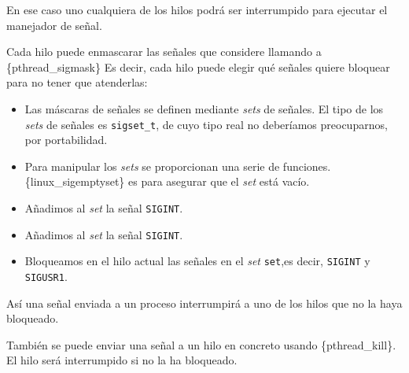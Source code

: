 En ese caso uno cualquiera de los hilos podrá ser interrumpido para
ejecutar el manejador de señal.

Cada hilo puede enmascarar las señales que considere llamando a
\{pthread\_sigmask\} Es decir, cada hilo puede elegir qué señales quiere
bloquear para no tener que atenderlas:

\begin{Shaded}
\begin{Highlighting}[]
\OperatorTok{;}               

\OperatorTok{(\&}\OperatorTok{);}          
\OperatorTok{(\&}\OperatorTok{,}\OperatorTok{);}    
\OperatorTok{(\&}\OperatorTok{,}\OperatorTok{);}   

\OperatorTok{(}\OperatorTok{,} \OperatorTok{\&}\OperatorTok{,}\OperatorTok{);} 
\end{Highlighting}
\end{Shaded}

\begin{itemize}
\item
  Las máscaras de señales se definen mediante \emph{sets} de señales. El
  tipo de los \emph{sets} de señales es \texttt{sigset\_t}, de cuyo tipo
  real no deberíamos preocuparnos, por portabilidad.
\item
  Para manipular los \emph{sets} se proporcionan una serie de funciones.
  \{linux\_sigemptyset\} es para asegurar que el \emph{set} está vacío.
\item
  Añadimos al \emph{set} la señal \texttt{SIGINT}.
\item
  Añadimos al \emph{set} la señal \texttt{SIGINT}.
\item
  Bloqueamos en el hilo actual las señales en el \emph{set}
  \texttt{set},es decir, \texttt{SIGINT} y \texttt{SIGUSR1}.
\end{itemize}

Así una señal enviada a un proceso interrumpirá a uno de los hilos que
no la haya bloqueado.

También se puede enviar una señal a un hilo en concreto usando
\{pthread\_kill\}. El hilo será interrumpido si no la ha bloqueado.

\begin{Shaded}
\begin{Highlighting}[]
\OperatorTok{(}\OperatorTok{,}\OperatorTok{);}
\end{Highlighting}
\end{Shaded}

